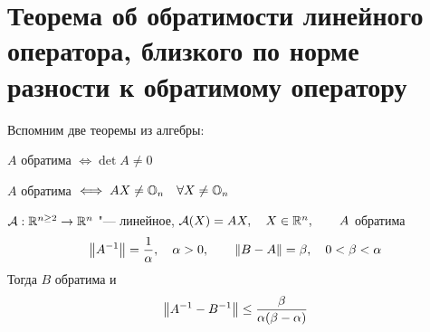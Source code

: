 \section{Теорема об обратимости линейного оператора, близкого по норме разности к обратимому оператору}

Вспомним две теоремы из алгебры:

\begin{remind}
	$ A $ обратима $ \iff \det A \ne 0 $
\end{remind}

\begin{remind}
	$ A $ обратима $ \iff AX \ne \mathbb{O}_{n} \quad \forall X \ne \mathbb{O}_{n} $
\end{remind}

\begin{theorem}
	$ \mathcal{A} : \mathbb{R}^{n \ge 2} \to \mathbb{R}^n $ "--- линейное, \ie $ \mathcal{A}(X) = AX, \quad X \in \mathbb{R}^n, \qquad A $ обратима
	$$ \left\|{A^{-1}}\right\| = \frac1\alpha, \quad \alpha > 0, \qquad \left\|{B - A}\right\| = \beta, \quad 0 < \beta < \alpha $$
	Тогда $ B $ обратима и
	$$ \left\|{A^{-1} - B^{-1}}\right\| \le \dfrac{\beta}{\alpha(\beta - \alpha)} $$
\end{theorem}

